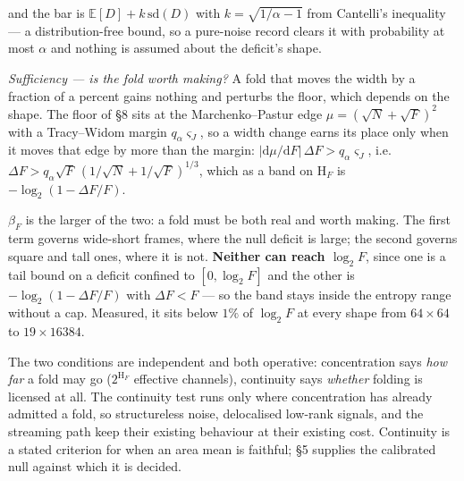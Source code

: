 \documentclass[10pt,letterpaper,twocolumn]{article}
\begin{document}

and the bar is \(\mathbb E[D]+k\,\mathrm{sd}(D)\) with \(k=\sqrt{1/\alpha-1}\) from Cantelli's inequality --- a distribution-free bound, so a pure-noise record clears it with probability at most \(\alpha\) and nothing is assumed about the deficit's shape.

\emph{Sufficiency --- is the fold worth making?} A fold that moves the width by a fraction of a percent gains nothing and perturbs the floor, which depends on the shape. The floor of §8 sits at the Marchenko--Pastur edge \(\mu=(\sqrt N+\sqrt F)^2\) with a Tracy--Widom margin \(q_\alpha\varsigma_J\), so a width change earns its place only when it moves that edge by more than the margin: \(|\mathrm d\mu/\mathrm dF|\,\Delta F>q_\alpha\varsigma_J\), i.e. \(\Delta F>q_\alpha\sqrt F\,(1/\sqrt N+1/\sqrt F)^{1/3}\), which as a band on \(\mathrm H_F\) is \(-\log_2(1-\Delta F/F)\).

\(\beta_F\) is the larger of the two: a fold must be both real and worth making. The first term governs wide-short frames, where the null deficit is large; the second governs square and tall ones, where it is not. \textbf{Neither can reach \(\log_2F\)}, since one is a tail bound on a deficit confined to \([0,\log_2F]\) and the other is \(-\log_2(1-\Delta F/F)\) with \(\Delta F<F\) --- so the band stays inside the entropy range without a cap. Measured, it sits below \(1\%\) of \(\log_2F\) at every shape from \(64\times64\) to \(19\times16384\).

The two conditions are independent and both operative: concentration says \emph{how far} a fold may go (\(2^{\mathrm{H}_F}\) effective channels), continuity says \emph{whether} folding is licensed at all. The continuity test runs only where concentration has already admitted a fold, so structureless noise, delocalised low-rank signals, and the streaming path keep their existing behaviour at their existing cost. Continuity is a stated criterion for when an area mean is faithful; §5 supplies the calibrated null against which it is decided.
\end{document}
